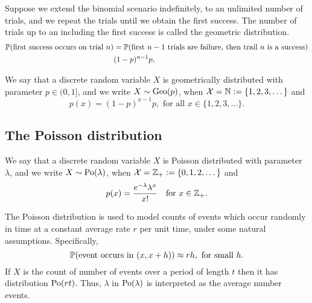 \documentclass[10pt, a4paper]{article}
\begin{document}
Suppose we extend the binomial scenario indefinitely,
to an unlimited number of trials,
and we repeat the trials until we obtain the first success.
The number of trials up to an including the first success is called the geometric distribution.
\begin{align*}
    \P(\text{first success occurs on trial } n) &= \P(\text{first } n - 1\text{ trials are failure, then trail } n \text{ is a success}) \\
    &(1 - p) ^ {n - 1} p,
\end{align*}

\begin{definition}
    We say that a discrete random variable $X$ is geometrically distributed with parameter $p \in (0, 1]$, and we write $X \sim \Geo(p)$, when $\mathcal{X} = \N := \{1, 2, 3, \dotsc\}$ and
    \[
    p(x) = (1 - p) ^ {x - 1} p,\text{ for all } x \in \{1, 2, 3, \dotsc\}.
    \]
\end{definition}

\subsection{The Poisson distribution}

\begin{definition}
    We say that a discrete random variable $X$ is Poisson distributed with parameter $\lambda$,
    and we write $X \sim \Po(\lambda)$,
    when $\mathcal{X} = \Z_+ := \{0, 1, 2, \dotsc\}$ and
    \[
    p(x) = \frac{e^{-\lambda}\lambda ^ x}{x!}\quad\text{for } x \in \Z_+.
    \]
\end{definition}
The Poisson distribution is used to model counts of events which occur randomly in time at a constant average rate $r$ per unit time,
under some natural assumptions. Specifically,
\[
\P(\text{event occurs in } (x, x + h)) \approx rh,\ \text{for small } h.
\]
If $X$ is the count of number of events over a period of length $t$ then it has distribution $\Po(rt)$.
Thus, $\lambda$ in $\Po(\lambda)$ is interpreted as the average number events.
\end{document}
